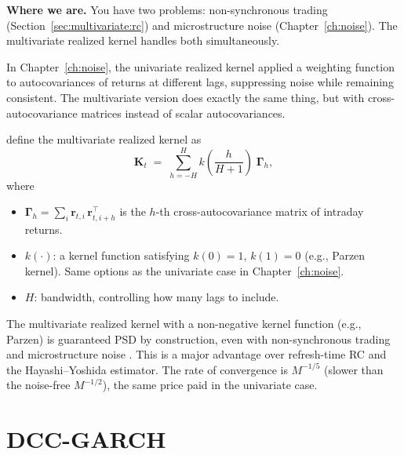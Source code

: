 \textbf{Where we are.}  You have two problems: non-synchronous trading
(Section~\ref{sec:multivariate:rc}) and microstructure noise
(Chapter~\ref{ch:noise}). The multivariate realized kernel handles both
simultaneously.

\begin{intuition}
In Chapter~\ref{ch:noise}, the univariate realized kernel applied a weighting
function to autocovariances of returns at different lags, suppressing noise
while remaining consistent. The multivariate version does exactly the same
thing, but with cross-autocovariance matrices instead of scalar autocovariances.
\end{intuition}

\begin{definition}
\citet{BarndorffNielsenHansenLundeShephard2011} define the multivariate
realized kernel as
\begin{equation}\label{eq:mrk}
  \mathbf{K}_t \;=\; \sum_{h=-H}^{H} k\!\left(\frac{h}{H+1}\right)
  \;\bm{\Gamma}_h,
\end{equation}
where
\begin{itemize}[nosep]
  \item $\bm{\Gamma}_h = \sum_{i} \mathbf{r}_{t,i}\,\mathbf{r}_{t,i+h}^\top$
        is the $h$-th cross-autocovariance matrix of intraday returns.
  \item $k(\cdot)$: a kernel function satisfying $k(0) = 1$, $k(1) = 0$
        (e.g., Parzen kernel). Same options as the univariate case in
        Chapter~\ref{ch:noise}.
  \item $H$: bandwidth, controlling how many lags to include.
\end{itemize}
\end{definition}

\begin{keyresult}
The multivariate realized kernel with a non-negative kernel function (e.g.,
Parzen) is guaranteed PSD by construction, even with non-synchronous trading
and microstructure noise \citep{BarndorffNielsenHansenLundeShephard2011}. This
is a major advantage over refresh-time RC and the Hayashi--Yoshida estimator.
The rate of convergence is $M^{-1/5}$ (slower than the noise-free $M^{-1/2}$),
the same price paid in the univariate case.
\end{keyresult}


\section{DCC-GARCH}\label{sec:multivariate:dcc}

